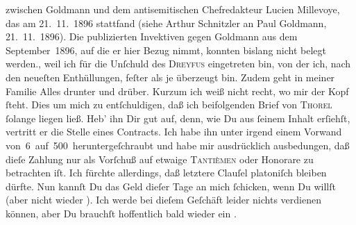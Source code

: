 \begin{ledgroupsized}[t]{13cm}
{{{                  zwischen Goldmann und dem antisemitischen
                  Chefredakteur Lucien Millevoye, das am
                     21. 11. 1896 stattfand (siehe Arthur Schnitzler an Paul Goldmann, 21. 11. 1896). Die publizierten Invektiven gegen Goldmann aus dem September 1896, auf die er hier Bezug nimmt, konnten bislang nicht
                  belegt werden.}}}\label{K_L02785-1h}, weil ich \strikeout{\textcolor{gray}{von}} für die Unſchuld des \textsc{Dreyfus} eingetreten bin, von der ich, nach den neueſten Enthüllungen, feſter als je
               überzeugt bin. Zudem geht in meiner Familie Alles drunter und drüber. Kurzum ich weiß
               nicht recht, wo mir {\pb}der Kopf ſteht.\pend
           \pstart
           Dies um mich zu entſchuldigen, daß ich  beifolgenden
               Brief von \textsc{Thorel} ſolange liegen ließ. Heb’ ihn Dir gut auf, denn, wie Du aus ſeinem Inhalt
               erſiehſt, vertritt er die Stelle eines Contracts. Ich habe ihn unter irgend einem
               Vorwand von 6 auf 500 heruntergeſchraubt und habe mir ausdrücklich ausbedungen, daß
               dieſe Zahlung nur als Vorſchuß auf etwaige {\pb}\strikeout{\textcolor{gray}{×}}{ }\textsc{Tantièmen} oder Honorare zu betrachten iſt. Ich fürchte
               allerdings, daß letztere Clauſel platoniſch bleiben dürfte. Nun kannſt Du das Geld
               dieſer Tage an mich ſchicken, wenn Du willſt (aber nicht wieder \label{K_L02785-2v}\label{K_L02785-2h}). Ich werde
               bei dieſem Geſchäft leider nichts verdienen können, aber Du brauchſt hoffentlich bald
               wieder ein \label{K_L02785-3v}\label{K_L02785-3h}.\pend

\end{ledgroupsized}
